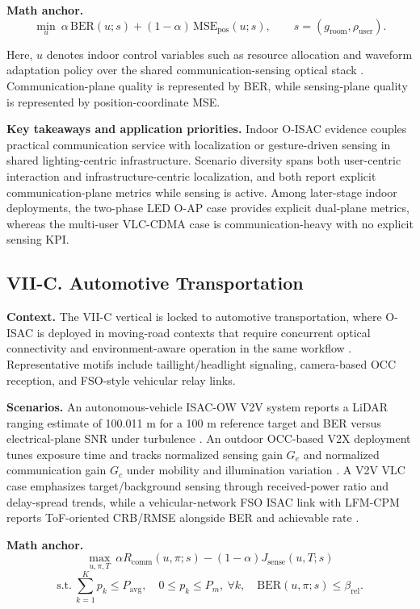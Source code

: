 \textbf{Math anchor.}
\[
\min_{u}\ \alpha\,\mathrm{BER}(u;s) + (1-\alpha)\,\mathrm{MSE}_{\mathrm{pos}}(u;s),
\qquad
s=(g_{\mathrm{room}},\rho_{\mathrm{user}}).
\]

Here, $u$ denotes indoor control variables such as resource allocation and waveform adaptation policy over the shared communication-sensing optical stack \cite{O_ISAC_108,O_ISAC_388}. Communication-plane quality is represented by BER, while sensing-plane quality is represented by position-coordinate MSE.

\textbf{Key takeaways and application priorities.} Indoor O-ISAC evidence couples practical communication service with localization or gesture-driven sensing in shared lighting-centric infrastructure. Scenario diversity spans both user-centric interaction and infrastructure-centric localization, and both report explicit communication-plane metrics while sensing is active. Among later-stage indoor deployments, the two-phase LED O-AP case provides explicit dual-plane metrics, whereas the multi-user VLC-CDMA case is communication-heavy with no explicit sensing KPI.

\subsection{VII-C. Automotive Transportation}

\textbf{Context.} The VII-C vertical is locked to automotive transportation, where O-ISAC is deployed in moving-road contexts that require concurrent optical connectivity and environment-aware operation in the same workflow \cite{O_ISAC_003,O_ISAC_060,O_ISAC_164}. Representative motifs include taillight/headlight signaling, camera-based OCC reception, and FSO-style vehicular relay links.

\textbf{Scenarios.} An autonomous-vehicle ISAC-OW V2V system reports a LiDAR ranging estimate of 100.011 m for a 100 m reference target and BER versus electrical-plane SNR under turbulence \cite{O_ISAC_060}. An outdoor OCC-based V2X deployment tunes exposure time and tracks normalized sensing gain $G_e$ and normalized communication gain $G_c$ under mobility and illumination variation \cite{O_ISAC_164}. A V2V VLC case emphasizes target/background sensing through received-power ratio and delay-spread trends, while a vehicular-network FSO ISAC link with LFM-CPM reports ToF-oriented CRB/RMSE alongside BER and achievable rate \cite{O_ISAC_003,O_ISAC_055}.

\textbf{Math anchor.}
\[
\max_{u,\pi,T}\ \alpha R_{\mathrm{comm}}(u,\pi;s)-(1-\alpha)J_{\mathrm{sense}}(u,T;s)
\]
\[
\text{s.t.}\ \sum_{k=1}^{K} p_k \le P_{\mathrm{avg}},\quad 0 \le p_k \le P_m,\ \forall k,\quad \mathrm{BER}(u,\pi;s)\le \beta_{\mathrm{rel}}.
\]

